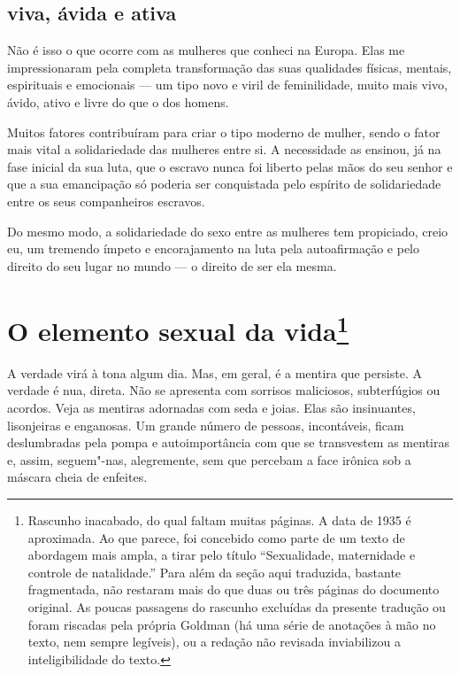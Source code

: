 \section{viva, ávida e ativa}

Não é isso o que ocorre com as mulheres que conheci na Europa. Elas me
impressionaram pela completa transformação das suas qualidades físicas,
mentais, espirituais e emocionais --- um tipo novo e viril de
feminilidade, muito mais vivo, ávido, ativo e livre do que o dos homens.

Muitos fatores contribuíram para criar o tipo moderno de mulher, sendo o
fator mais vital a solidariedade das mulheres entre si. A necessidade as
ensinou, já na fase inicial da sua luta, que o escravo nunca foi liberto
pelas mãos do seu senhor e que a sua emancipação só poderia ser
conquistada pelo espírito de solidariedade entre os seus companheiros
escravos.

Do mesmo modo, a solidariedade do sexo entre as mulheres tem propiciado,
creio eu, um tremendo ímpeto e encorajamento na luta pela autoafirmação
e pelo direito do seu lugar no mundo --- o direito de ser ela mesma.

\chapter{O elemento sexual da vida\footnote{Rascunho inacabado, do qual faltam muitas
  páginas. A data de 1935 é aproximada. Ao que parece, foi
  concebido como parte de um texto de abordagem mais ampla, a tirar pelo
  título ``Sexualidade, maternidade e controle de natalidade.'' Para
  além da seção aqui traduzida, bastante fragmentada, não restaram
  mais do que duas ou três páginas do documento original. As
  poucas passagens do rascunho excluídas da presente tradução ou
  foram riscadas pela própria Goldman (há uma série de anotações à mão
  no texto, nem sempre legíveis), ou a redação não revisada inviabilizou
  a inteligibilidade do texto.}}\label{sexual}

A verdade virá à tona algum dia. Mas, em geral, é a mentira que
persiste. A verdade é nua, direta. Não se apresenta com sorrisos
maliciosos, subterfúgios ou acordos. Veja as mentiras adornadas com seda
e joias. Elas são insinuantes, lisonjeiras e enganosas. Um grande número de pessoas,
incontáveis, ficam deslumbradas pela pompa e autoimportância com que se
transvestem as mentiras e, assim, seguem"-nas, alegremente, sem que percebam
a face irônica sob a máscara cheia de enfeites.

